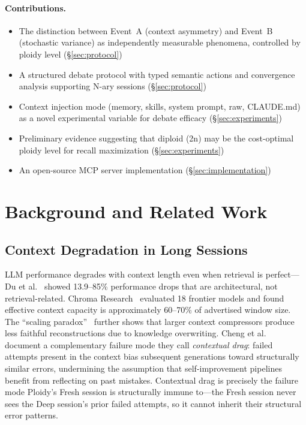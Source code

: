 \documentclass[11pt]{article}
\begin{document}
\paragraph{Contributions.}
\begin{itemize}[leftmargin=1.5em]
  \item The distinction between Event~A (context asymmetry) and Event~B (stochastic variance) as independently measurable phenomena, controlled by ploidy level (\S\ref{sec:protocol})
  \item A structured debate protocol with typed semantic actions and convergence analysis supporting N-ary sessions (\S\ref{sec:protocol})
  \item Context injection mode (memory, skills, system prompt, raw, CLAUDE.md) as a novel experimental variable for debate efficacy (\S\ref{sec:experiments})
  \item Preliminary evidence suggesting that diploid (2n) may be the cost-optimal ploidy level for recall maximization (\S\ref{sec:experiments})
  \item An open-source MCP server implementation (\S\ref{sec:implementation})
\end{itemize}

\section{Background and Related Work}
\label{sec:related}

\subsection{Context Degradation in Long Sessions}
\label{sec:context-degradation}

LLM performance degrades with context length even when retrieval is perfect---Du et al.~\citep{du2025context} showed 13.9--85\% performance drops that are architectural, not retrieval-related. Chroma Research~\citep{chroma2025contextrot} evaluated 18 frontier models and found effective context capacity is approximately 60--70\% of advertised window size. The ``scaling paradox''~\citep{scaling2026paradox} further shows that larger context compressors produce less faithful reconstructions due to knowledge overwriting. Cheng et al.~\citep{cheng2026contextualdrag} document a complementary failure mode they call \emph{contextual drag}: failed attempts present in the context bias subsequent generations toward structurally similar errors, undermining the assumption that self-improvement pipelines benefit from reflecting on past mistakes. Contextual drag is precisely the failure mode Ploidy's Fresh session is structurally immune to---the Fresh session never sees the Deep session's prior failed attempts, so it cannot inherit their structural error patterns.
\end{document}
